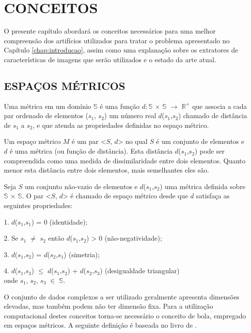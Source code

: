 \chapter{CONCEITOS}
\label{chap:conceitos}
O presente capítulo abordará os conceitos necessários para uma melhor compreensão dos artifícios utilizados para tratar o problema apresentado no Capítulo \ref{chap:introducao}, assim como uma
explanação sobre os extratores de características de imagens que serão utilizados e o estado da arte atual.

\section{ESPAÇOS MÉTRICOS}
\label{sec:espmet}
Uma métrica em um domínio $\mathbb{S}$ é uma função $d:\mathbb{S}$ $\times$ $\mathbb{S}$ $\rightarrow$ $\mathbb{R^{+}}$ que associa a cada par 
ordenado de elementos ($s_1$, $s_2$) um número real $d$($s_1$,$s_2$) chamado de distância de $s_1$ a $s_2$, e que atenda
as propriedades definidas no espaço métrico\cite{Lima1977}.\par
Um espaço métrico $M$ é um par <$S$, $d$> no qual $S$ é um conjunto de elementos e $d$ é uma métrica
(ou função de distância). Esta distância $d$($s_1$,$s_2$) pode ser compreendida como uma medida de dissimilaridade entre dois elementos.
Quanto menor esta distância entre dois elementos, mais semelhantes eles são.
\begin{mydef}
 \label{def:espmet}
  Seja $S$ um conjunto não-vazio de elementos e $d$($s_1$,$s_2$) uma métrica definida sobre $\mathbb{S}$ $\times$ $\mathbb{S}$.
   O par <$S$, $d$> é chamado de espaço métrico desde que $d$ satisfaça as seguintes propriedades:\par
1. $d$($s_1$,$s_1$) = 0 (identidade);\par
2. Se $s_1$ $\neq$ $s_2$ ent\~ao $d$($s_1$,$s_2$) > 0 (n\~ao-negatividade);\par
3. $d$($s_1$,$s_2$) = $d$($s_2$,$s_1$) (simetria);\par
4. $d$($s_1$,$s_3$) $\leq$ $d$($s_1$,$s_2$) + $d$($s_2$,$s_3$) (desigualdade triangular)\\
onde $s_1$, $s_2$, $s_3$ $\in$ $\mathbb{S}$.
\end{mydef}
O conjunto de dados complexos a ser utilizado geralmente apresenta dimensões elevadas, mas também podem não ter dimensão fixa. Para a utilização computacional destes conceitos torna-se necessário o conceito de bola,
empregado em espaços métricos. A seguinte definição é baseada no livro de \cite{Shirali2005}.

